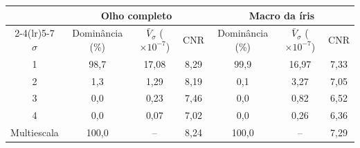 \begin{tabular}{ccccccc}
\toprule
 & \multicolumn{3}{c}{Olho completo} & \multicolumn{3}{c}{Macro da íris} \\
\cmidrule(lr){2-4}\cmidrule(lr){5-7}
$\sigma$ & Dominância (\%) & $\bar{V}_\sigma$ ($\times10^{-7}$) & CNR & Dominância (\%) & $\bar{V}_\sigma$ ($\times10^{-7}$) & CNR \\
\midrule
1 & 98,7 & 17,08 & 8,29 & 99,9 & 16,97 & 7,33 \\
2 & 1,3 & 1,29 & 8,19 & 0,1 & 3,27 & 7,05 \\
3 & 0,0 & 0,23 & 7,46 & 0,0 & 0,82 & 6,52 \\
4 & 0,0 & 0,07 & 7,02 & 0,0 & 0,26 & 6,36 \\
\midrule
Multiescala & 100,0 & -- & 8,24 & 100,0 & -- & 7,29 \\
\bottomrule
\end{tabular}
